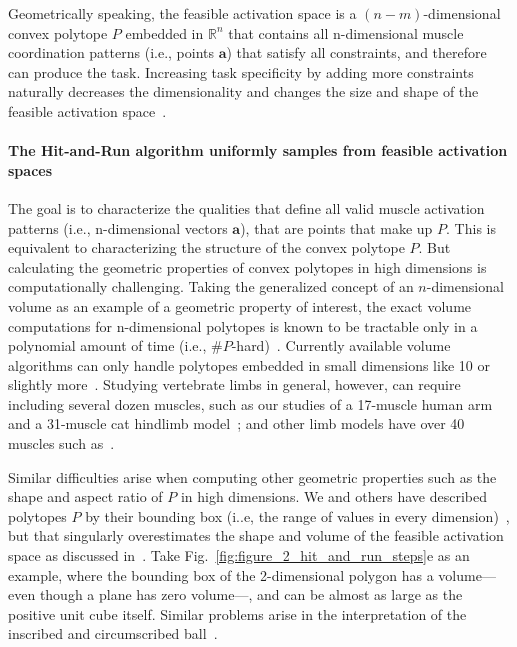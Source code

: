 \documentclass[9pt,twocolumn,twoside,lineno]{pnas-new}
\begin{document}
{Geometrically speaking, the feasible activation space is a $(n-m)$-dimensional convex polytope $P$ embedded in $\mathbb{R}^n$ that contains all n-dimensional muscle coordination patterns (i.e., points $\textbf{a}$) that satisfy all constraints, and therefore can produce the task. Increasing task specificity by adding more constraints naturally decreases the dimensionality and changes the size and shape of the feasible activation space~\cite{Kuo1993Human,sohn2013cat_bounding_box,inouye2016muscle}.


\paragraph*{The Hit-and-Run algorithm uniformly samples from feasible activation spaces}
\label{ss:hitrun}

The goal is to characterize the qualities that define all valid muscle activation patterns (i.e., n-dimensional vectors $\textbf{a}$), that are points that make up $P$. This is equivalent to characterizing the structure of the convex polytope $P$. But calculating the geometric properties of convex polytopes in high dimensions is computationally challenging. Taking the generalized concept of an $n$-dimensional volume as an example of a geometric property of interest, the exact volume computations for n-dimensional polytopes is known to be tractable only in a polynomial amount of time (i.e., $\#P$-hard)~\cite{Dyer}.
Currently available volume algorithms can only handle polytopes embedded in small dimensions like 10 or slightly more~\cite{Bueler2}. Studying vertebrate limbs in general, however, can require including several dozen muscles, such as our studies of a 17-muscle human arm and a 31-muscle cat hindlimb model~\cite{Valero-Cuevas2015high-dimensional}; and other limb models have over 40 muscles such as~\cite{arnold2010model, kutch2012challenges, hamner2010muscle, de2014human}.

Similar difficulties arise when computing other geometric properties such as the shape and aspect ratio of $P$ in high dimensions. We and others have described polytopes $P$ by their bounding box (i..e, the range of values in every dimension)~\cite{sohn2013cat_bounding_box,kutch2011muscle}, but that singularly overestimates the shape and volume of the feasible activation space as discussed in~\cite{Valero-Cuevas2015high-dimensional}.
Take Fig.~\ref{fig:figure_2_hit_and_run_steps}e as an example, where the bounding box of the 2-dimensional polygon has a volume---even though a plane has zero volume---, and can be almost as large as the positive unit cube itself. Similar problems arise in the interpretation of the inscribed and circumscribed ball~\cite{inouye2014optimizing}.

}
\end{document}
